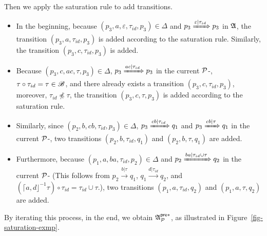 \begin{example}
Then we apply the saturation rule to add transitions.
\begin{itemize}
\item In the beginning, because $(p_3, a, \varepsilon, \tau_{id}, p_3) \in \Delta$ and $p_3 \xRightarrow{\varepsilon | \tau_{id}} p_3$ in ${\mathfrak{A} }$, the transition $(p_3, a, \tau_{id}, p_3)$ is added according to the saturation rule. Similarly, the transition $(p_3, c, \tau_{id}, p_3)$ is added. 
%
\item Because $(p_3, c, ac, \tau, p_3) \in \Delta$, $p_3 \xRightarrow{ac | \tau_{id}} p_3$  in the current ${\mathcal{P} }$-{\WOTrNFA}, $\tau \circ \tau_{id} = \tau \in {\mathscr{B} }$, and 
 there already exists a transition $(p_3, c, \tau_{id}, p_3)$, moreover, $\tau_{id} \not \preceq \tau$, the transition $(p_3, c, \tau, p_3)$ is added according to the saturation rule. 
%
\item Similarly, since $(p_2, b, cb, \tau_{id}, p_3) \in \Delta$, $p_3 \xRightarrow{cb | \tau_{id}} q_1$ and $p_3 \xRightarrow{cb | \tau} q_1$ in the current ${\mathcal{P} }$-{\WOTrNFA}, two transitions $(p_2, b, \tau_{id}, q_1)$  and $(p_2, b, \tau, q_1)$ are added. 
%
\item Furthermore, because $(p_1, a, ba, \tau_{id}, p_2) \in \Delta$ and $p_2 \xRightarrow{ba | \tau_{id} \cup \tau} q_2$ in the current ${\mathcal{P} }$-{\WOTrNFA} (This follows from $p_2 \xrightarrow{b | \tau} q_1$, $q_1 \xrightarrow{d | \tau_{id}} q_2$, and $(\lceil a, d\rfloor^{-1} \tau) \circ \tau_{id} = \tau_{id} \cup \tau$.), two transitions $(p_1, a, \tau_{id}, q_2)$  and $(p_1, a, \tau, q_2)$ are added.
%
\end{itemize}
By iterating this process, in the end, we obtain ${\mathfrak{A} }^{{\mathsf{pre} }*}_{{\mathcal{P} }}$, as illustrated in Figure~\ref{fig-saturation-exmp}.
\begin{figure}[htb]
    \centering

\end{figure}
\end{example}

